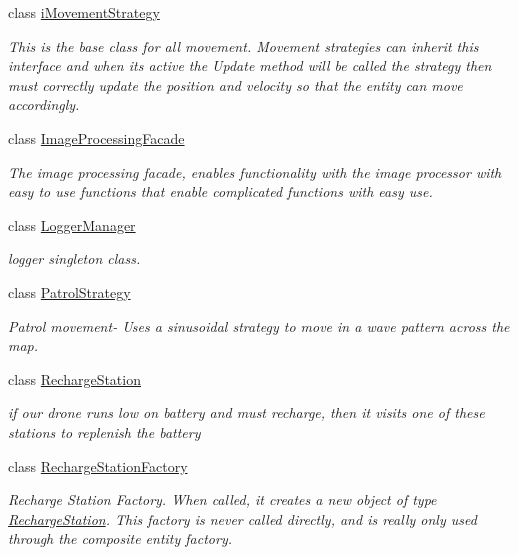 \begin{DoxyCompactItemize}
class \hyperlink{classiMovementStrategy}{i\+Movement\+Strategy}
\begin{DoxyCompactList}\small\item\em This is the base class for all movement. Movement strategies can inherit this interface and when it\textquotesingle{}s active the Update method will be called the strategy then must correctly update the position and velocity so that the entity can move accordingly. \end{DoxyCompactList}\item 
class \hyperlink{classImageProcessingFacade}{Image\+Processing\+Facade}
\begin{DoxyCompactList}\small\item\em The image processing facade, enables functionality with the image processor with easy to use functions that enable complicated functions with easy use. \end{DoxyCompactList}\item 
class \hyperlink{classLoggerManager}{Logger\+Manager}
\begin{DoxyCompactList}\small\item\em logger singleton class. \end{DoxyCompactList}\item 
class \hyperlink{classPatrolStrategy}{Patrol\+Strategy}
\begin{DoxyCompactList}\small\item\em Patrol movement-\/ Uses a sinusoidal strategy to move in a wave pattern across the map. \end{DoxyCompactList}\item 
class \hyperlink{classRechargeStation}{Recharge\+Station}
\begin{DoxyCompactList}\small\item\em if our drone runs low on battery and must recharge, then it visits one of these stations to replenish the battery \end{DoxyCompactList}\item 
class \hyperlink{classRechargeStationFactory}{Recharge\+Station\+Factory}
\begin{DoxyCompactList}\small\item\em Recharge Station Factory. When called, it creates a new object of type \hyperlink{classRechargeStation}{Recharge\+Station}. This factory is never called directly, and is really only used through the composite entity factory. \end{DoxyCompactList}\item 

\end{DoxyCompactItemize}
